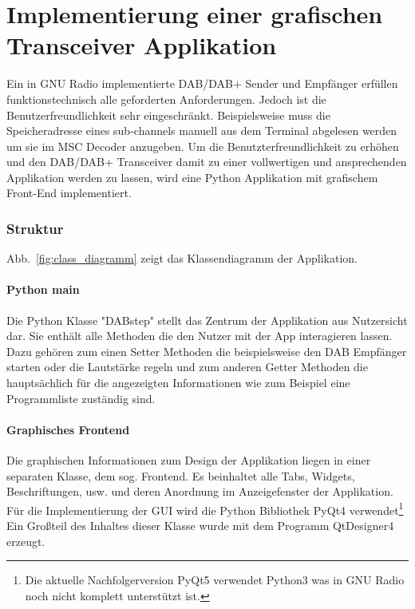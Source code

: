 \chapter{Implementierung einer grafischen Transceiver Applikation}
Ein in GNU Radio implementierte DAB/DAB+ Sender und Empfänger erfüllen funktionstechnisch alle geforderten Anforderungen. Jedoch ist die Benutzerfreundlichkeit sehr eingeschränkt. Beispielsweise muss die Speicheradresse eines sub-channels manuell aus dem Terminal abgelesen werden um sie im MSC Decoder anzugeben. Um die Benutzterfreundlichkeit zu erhöhen und den DAB/DAB+ Transceiver damit zu einer vollwertigen und ansprechenden Applikation werden zu lassen, wird eine Python Applikation mit grafischem Front-End implementiert.
\subsection{Struktur}
Abb.~\ref{fig:class_diagramm} zeigt das Klassendiagramm der Applikation.

\subsubsection{Python main}
Die Python Klasse "DABstep" stellt das Zentrum der Applikation aus Nutzersicht dar. Sie enthält alle Methoden die den Nutzer mit der App interagieren lassen. Dazu gehören zum einen Setter Methoden die beispielsweise den DAB Empfänger starten oder die Lautstärke regeln und zum anderen Getter Methoden die hauptsächlich für die angezeigten Informationen wie zum Beispiel eine Programmliste zuständig sind.

\subsubsection{Graphisches Frontend}
Die graphischen Informationen zum Design der Applikation liegen in einer separaten Klasse, dem sog. Frontend. Es beinhaltet alle Tabs, Widgets, Beschriftungen, usw. und deren Anordnung im Anzeigefenster der Applikation. Für die Implementierung der \ac{GUI} wird die Python Bibliothek PyQt4 verwendet\footnote{Die aktuelle Nachfolgerversion PyQt5 verwendet Python3 was in GNU Radio noch nicht komplett unterstützt ist.} Ein Großteil des Inhaltes dieser Klasse wurde mit dem Programm QtDesigner4 erzeugt.


